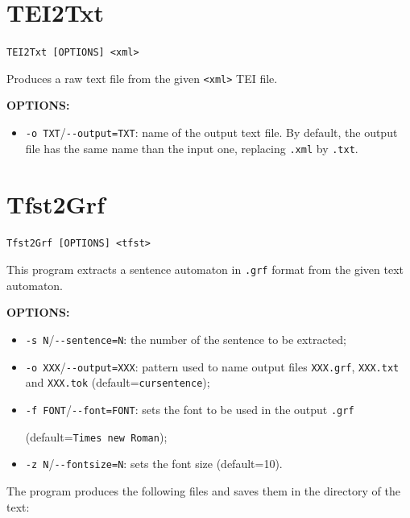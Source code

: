 \section{TEI2Txt} 
\verb+TEI2Txt [OPTIONS] <xml>+

\bigskip
\noindent Produces a raw text file from the given \verb+<xml>+ TEI file.

\bigskip
\noindent \textbf{OPTIONS:}
\begin{itemize}
  \item \verb+-o TXT+/\verb+--output=TXT+: name of the output text file.
  By default, the output file has the same name than the input one, 
  replacing \verb+.xml+ by \verb+.txt+.
\end{itemize}







\section{Tfst2Grf}
\verb+Tfst2Grf [OPTIONS] <tfst>+

\bigskip
\noindent This program extracts a sentence automaton in \verb+.grf+ format from
the given text automaton. 

\bigskip
\noindent \textbf{OPTIONS:}
\begin{itemize}
  \item \verb+-s N+/\verb+--sentence=N+: the number of the sentence to be
  extracted;
  
  \item \verb+-o XXX+/\verb+--output=XXX+: pattern used to name output files 
 \verb+XXX.grf+, \verb+XXX.txt+ and \verb+XXX.tok+ (default=\verb+cursentence+);
 
  \item \verb+-f FONT+/\verb+--font=FONT+: sets the font to be used in the
  output \verb+.grf+
   
  (default=\verb+Times new Roman+);
  \item \verb+-z N+/\verb+--fontsize=N+: sets the font size (default=10).
\end{itemize}

\bigskip
\noindent The program produces the following files and saves them in the
directory of the text:

